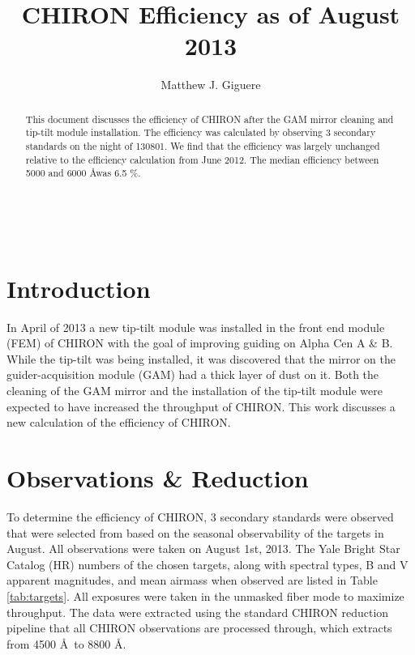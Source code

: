 \documentclass[iop]{emulateapj}
\begin{document}
\title{CHIRON Efficiency as of August 2013}

\author{Matthew J. Giguere}	

\begin{abstract}
This document discusses the efficiency of CHIRON after the GAM mirror cleaning and tip-tilt module installation. The efficiency was calculated by observing 3 secondary standards on the night of 130801. We find that the efficiency was largely unchanged relative to the efficiency calculation from June 2012. The median efficiency between 5000 and 6000 \AA was 6.5 \%.

\end{abstract}


\ \


\section{Introduction}
In April of 2013 a new tip-tilt module was installed in the front end module (FEM) of CHIRON with the goal of improving guiding on Alpha Cen A \& B. While the tip-tilt was being installed, it was discovered that the mirror on the guider-acquisition module (GAM) had a thick layer of dust on it. Both the cleaning of the GAM mirror and the installation of the tip-tilt module were expected to have increased the throughput of CHIRON. This work discusses a new calculation of the efficiency of CHIRON.

\section{Observations \& Reduction}

To determine the efficiency of CHIRON, 3 secondary standards were observed that were selected from \citep{1992PASP..104..533H, 1994PASP..106..566H} based on the seasonal observability of the targets in August. All observations were taken on August 1st, 2013. The Yale Bright Star Catalog (HR) numbers of the chosen targets, along with spectral types, B and V apparent magnitudes, and mean airmass when observed are listed in Table \ref{tab:targets}. All exposures were taken in the unmasked fiber mode to maximize throughput. The data were extracted using the standard CHIRON reduction pipeline that all CHIRON observations are processed through, which extracts from 4500 \AA~to 8800 \AA.
\end{document}
